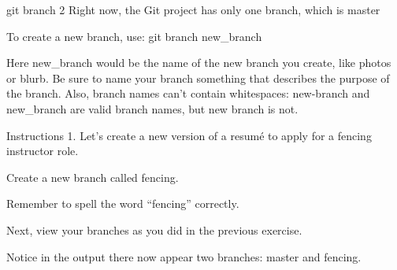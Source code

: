 git branch 2
    Right now, the Git project has only one branch, which is master

    To create a new branch, use:
        git branch new_branch
    
    Here new_branch would be the name of the new branch you create, like photos or blurb. Be sure to name your branch something that describes the purpose of the branch. Also, branch names can’t contain whitespaces: new-branch and new_branch are valid branch names, but new branch is not.

Instructions
    1.
    Let’s create a new version of a resumé to apply for a fencing instructor role.

    Create a new branch called fencing.

    Remember to spell the word “fencing” correctly.

    Next, view your branches as you did in the previous exercise.

    Notice in the output there now appear two branches: master and fencing.